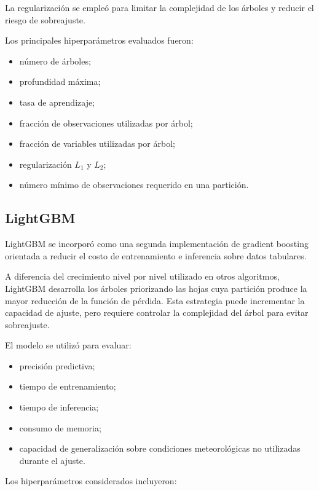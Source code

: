 La regularización se empleó para limitar la complejidad de los árboles y reducir el riesgo de sobreajuste.

Los principales hiperparámetros evaluados fueron:

\begin{itemize}
    \item número de árboles;
    \item profundidad máxima;
    \item tasa de aprendizaje;
    \item fracción de observaciones utilizadas por árbol;
    \item fracción de variables utilizadas por árbol;
    \item regularización $L_1$ y $L_2$;
    \item número mínimo de observaciones requerido en una partición.
\end{itemize}

\subsection{LightGBM}
\label{subsec:lightgbm_metodologia}

LightGBM se incorporó como una segunda implementación de gradient boosting orientada a reducir el costo de entrenamiento e inferencia sobre datos tabulares.

A diferencia del crecimiento nivel por nivel utilizado en otros algoritmos, LightGBM desarrolla los árboles priorizando las hojas cuya partición produce la mayor reducción de la función de pérdida. Esta estrategia puede incrementar la capacidad de ajuste, pero requiere controlar la complejidad del árbol para evitar sobreajuste.

El modelo se utilizó para evaluar:

\begin{itemize}
    \item precisión predictiva;
    \item tiempo de entrenamiento;
    \item tiempo de inferencia;
    \item consumo de memoria;
    \item capacidad de generalización sobre condiciones meteorológicas no utilizadas durante el ajuste.
\end{itemize}

Los hiperparámetros considerados incluyeron:

